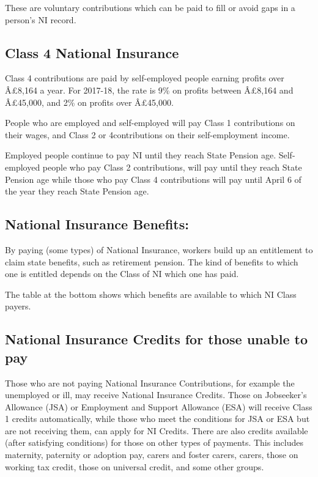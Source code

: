 \documentclass[]{tufte-handout}
\begin{document}
These are voluntary contributions which can be paid to fill or avoid
gaps in a person's NI record.

\hypertarget{class-4-national-insurance}{%
\subsection{Class 4 National
Insurance}\label{class-4-national-insurance}}

Class 4 contributions are paid by self-employed people earning profits
over Â£8,164 a year. For 2017-18, the rate is 9\% on profits between
Â£8,164 and Â£45,000, and 2\% on profits over Â£45,000.

People who are employed and self-employed will pay Class 1 contributions
on their wages, and Class 2 or 4contributions on their self-employment
income.

Employed people continue to pay NI until they reach State Pension age.
Self-employed people who pay Class 2 contributions, will pay until they
reach State Pension age while those who pay Class 4 contributions will
pay until April 6 of the year they reach State Pension age.

\hypertarget{national-insurance-benefits}{%
\subsection{National Insurance
Benefits:}\label{national-insurance-benefits}}

By paying (some types) of National Insurance, workers build up an
entitlement to claim state benefits, such as retirement pension. The
kind of benefits to which one is entitled depends on the Class of NI
which one has paid.

The table at the bottom shows which benefits are available to which NI
Class payers.

\hypertarget{national-insurance-credits-for-those-unable-to-pay}{%
\subsection{National Insurance Credits for those unable to
pay}\label{national-insurance-credits-for-those-unable-to-pay}}

Those who are not paying National Insurance Contributions, for example
the unemployed or ill, may receive National Insurance Credits. Those on
Jobseeker's Allowance (JSA) or Employment and Support Allowance (ESA)
will receive Class 1 credits automatically, while those who meet the
conditions for JSA or ESA but are not receiving them, can apply for NI
Credits. There are also credits available (after satisfying conditions)
for those on other types of payments. This includes maternity, paternity
or adoption pay, carers and foster carers, carers, those on working tax
credit, those on universal credit, and some other groups.
\end{document}

